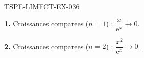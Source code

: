 \begin{corrige}{TSPE-LIMFCT-EX-036}

\textbf{1.} Croissances comparees ($n=1$) : $\dfrac{x}{\mathrm{e}^x} \to \boxed{0}$.

\textbf{2.} Croissances comparees ($n=2$) : $\dfrac{x^2}{\mathrm{e}^x} \to \boxed{0}$.

\end{corrige}
